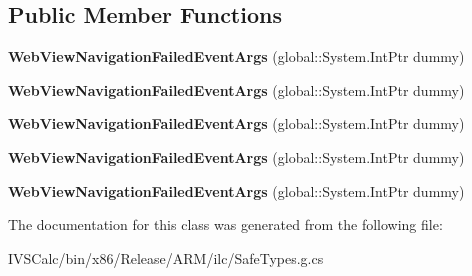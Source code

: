 \subsection*{Public Member Functions}
\begin{DoxyCompactItemize}
\item 
\mbox{\label{class_windows_1_1_u_i_1_1_xaml_1_1_controls_1_1_web_view_navigation_failed_event_args_a28b1aee4f0939f865f434ed7c58cd518}} 
{\bfseries Web\+View\+Navigation\+Failed\+Event\+Args} (global\+::\+System.\+Int\+Ptr dummy)
\item 
\mbox{\label{class_windows_1_1_u_i_1_1_xaml_1_1_controls_1_1_web_view_navigation_failed_event_args_a28b1aee4f0939f865f434ed7c58cd518}} 
{\bfseries Web\+View\+Navigation\+Failed\+Event\+Args} (global\+::\+System.\+Int\+Ptr dummy)
\item 
\mbox{\label{class_windows_1_1_u_i_1_1_xaml_1_1_controls_1_1_web_view_navigation_failed_event_args_a28b1aee4f0939f865f434ed7c58cd518}} 
{\bfseries Web\+View\+Navigation\+Failed\+Event\+Args} (global\+::\+System.\+Int\+Ptr dummy)
\item 
\mbox{\label{class_windows_1_1_u_i_1_1_xaml_1_1_controls_1_1_web_view_navigation_failed_event_args_a28b1aee4f0939f865f434ed7c58cd518}} 
{\bfseries Web\+View\+Navigation\+Failed\+Event\+Args} (global\+::\+System.\+Int\+Ptr dummy)
\item 
\mbox{\label{class_windows_1_1_u_i_1_1_xaml_1_1_controls_1_1_web_view_navigation_failed_event_args_a28b1aee4f0939f865f434ed7c58cd518}} 
{\bfseries Web\+View\+Navigation\+Failed\+Event\+Args} (global\+::\+System.\+Int\+Ptr dummy)
\end{DoxyCompactItemize}


The documentation for this class was generated from the following file\+:\begin{DoxyCompactItemize}
\item 
I\+V\+S\+Calc/bin/x86/\+Release/\+A\+R\+M/ilc/Safe\+Types.\+g.\+cs\end{DoxyCompactItemize}
